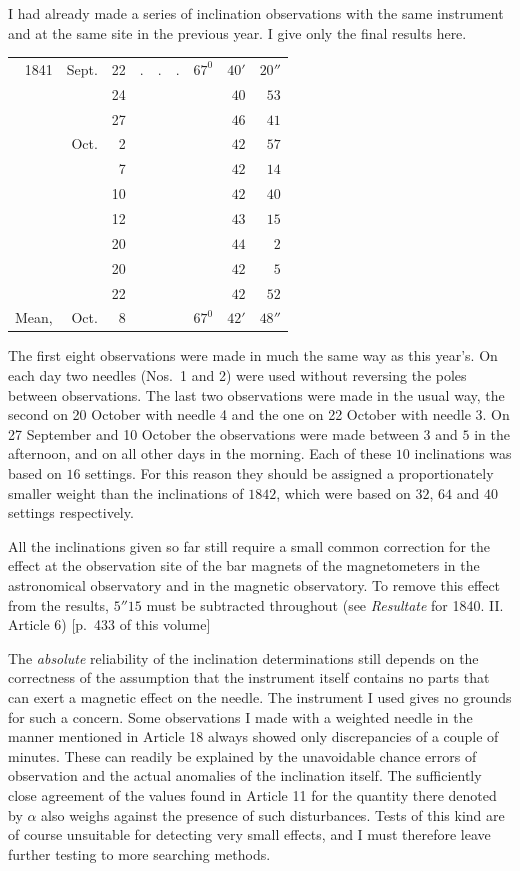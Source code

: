 I had already made a series of inclination observations with the same instrument and at the same site in the previous year. I give only the final results here.
\begin{center}
\begin{tabular}{rrrcrrr}
1841&Sept.&22&$.\quad.\quad.$&$67^0$&$40'$&$20''$\\
&&24&&&$40$&$53$\\
&&27&&&$46$&$41$\\
&Oct.&2&&&$42$&$57$\\
&&7&&&$42$&$14$\\
&&10&&&$42$&$40$\\
&&12&&&$43$&$15$\\
&&20&&&$44$&$2$\\
&&20&&&$42$&$5$\\
&&22&&&$42$&$52$\\\hline
Mean,&Oct.&8&&$67^0$&$42'$&$48''$
\end{tabular}
\end{center}
The first eight observations were made in much the same way as this year's. On each day two needles (Nos.\ 1 and 2) were used without reversing the poles between observations. The last two observations were made in the usual way, the second on 20 October with needle 4 and the one on 22 October with needle 3. On 27 September and 10 October the observations were made between $3$ and $5$ in the afternoon, and on all other days in the morning. Each of these $10$ inclinations was based on $16$ settings. For this reason they should be assigned a proportionately smaller weight than the inclinations of $1842$, which were based on $32$, $64$ and $40$ settings respectively.

All the inclinations given so far still require a small common correction for the effect at the observation site of the bar magnets of the magnetometers in the astronomical observatory and in the magnetic observatory. To remove this effect from the results, $5''15$ must be subtracted throughout (see \textit{Resultate} for 1840. II. Article 6) [p.\ 433 of this volume]

The \textit{absolute} reliability of the inclination determinations still depends on the correctness of the assumption that the instrument itself contains no parts that can exert a magnetic effect on the needle. The instrument I used gives no grounds for such a concern. Some observations I made with a weighted needle in the manner mentioned in Article 18 always showed only discrepancies of a couple of minutes. These can readily be explained by the unavoidable chance errors of observation and the actual anomalies of the inclination itself. The sufficiently close agreement of the values found in Article 11 for the quantity there denoted by $\alpha$ also weighs against the presence of such disturbances. Tests of this kind are of course unsuitable for detecting very small effects, and I must therefore leave further testing to more searching methods.

